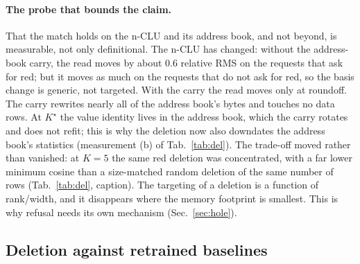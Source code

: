 \documentclass{article} %
\newcommand{\Kstar}{\ensuremath{K^{\star}}}
\begin{document}
\paragraph{The probe that bounds the claim.} That the match holds on the n-CLU and its address book,
and not beyond, is measurable, not only definitional.
The n-CLU has changed: without the address-book carry, the read moves by about 0.6 relative RMS on
the requests that ask for red; but it moves as much on the requests that do not ask
for red, so the basis change is generic, not targeted. With the carry the read moves
only at roundoff. The carry rewrites nearly all of the
address book's bytes and touches no data rows. %
At $\Kstar$ the value identity
lives in the address book, which the carry rotates and does not refit; this is why the deletion
now also downdates the address book's statistics (measurement (b) of Tab.~\ref{tab:del}). The trade-off moved
rather than vanished: at $K=5$ the same red deletion was concentrated,
with a far lower minimum cosine than a size-matched random deletion of the same number of
rows (Tab.~\ref{tab:del}, caption). %
The targeting of a deletion is a function of rank/width, and it disappears where the memory footprint
is smallest. This is why refusal needs its own mechanism (Sec.~\ref{sec:hole}).

\subsection{Deletion against retrained baselines}
\label{sec:del-comparators}
\end{document}
